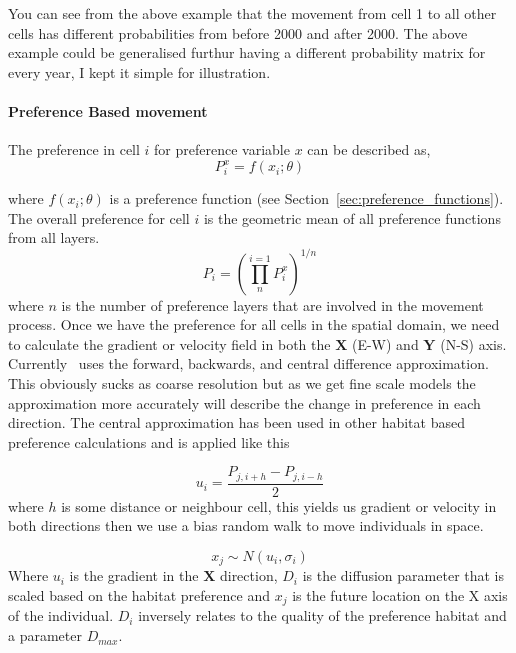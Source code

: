 You can see from the above example that the movement from cell 1 to all other cells has different probabilities from before 2000 and after 2000. The above example could be generalised furthur having a different probability matrix for every year, I kept it simple for illustration.


\paragraph{Preference Based movement}\label{subsubsec:pref_movement}

The preference in cell $i$ for preference variable $x$ can be described as,
\begin{equation}
P_i^x = f(x_i; \theta)
\end{equation}

where $f(x_i; \theta)$ is a preference function (see Section~\ref{sec:preference_functions}). The overall preference for cell $i$ is the geometric mean of all preference functions from all layers.
\begin{equation}
   P_i = \left(\prod_{n}^{i = 1}P_i^x\right)^{1/n}
\end{equation}
%
where $n$ is the number of preference layers that are involved in the movement process. Once we have the preference for all cells in the spatial domain, we need to calculate the gradient or velocity field in both the $\textbf{X}$ (E-W) and $\textbf{Y}$ (N-S) axis. Currently \IBM\ uses the forward, backwards, and central difference approximation. This obviously sucks as coarse resolution but as we get fine scale models the approximation more accurately will describe the change in preference in each direction. The central approximation has been used in other habitat based preference calculations \citep{phillips2018individual} and is applied like this

\begin{equation}
u_i = \frac{P_{j, i + h} - P_{j, i - h}}{2}
\end{equation}
%
where $h$ is some distance or neighbour cell, this yields us gradient or velocity in both directions then we use a bias random walk to move individuals in space.

\begin{equation}
x_j \sim N(u_i, \sigma_i)
\end{equation}
%
Where $u_i$ is the gradient in the $\textbf{X}$ direction, $D_{i}$ is the diffusion parameter that is scaled based on the habitat preference and $x_j$ is the future location on the X axis of the individual. $D_{i}$ inversely relates to the quality of the preference habitat and a parameter $D_{max}$.

